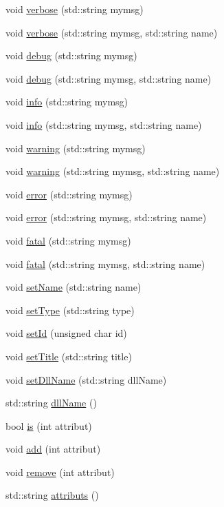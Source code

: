 \begin{DoxyCompactItemize}
\item 
void \hyperlink{classObject_a83d2db2df682907ea1115ad721c1c4a1}{verbose} (std::string mymsg)
\item 
void \hyperlink{classObject_a2d4120195317e2a3c6532e8bb9f3da68}{verbose} (std::string mymsg, std::string name)
\item 
void \hyperlink{classObject_aac010553f022165573714b7014a15f0d}{debug} (std::string mymsg)
\item 
void \hyperlink{classObject_a6c9a0397ca804e04d675ed05683f5420}{debug} (std::string mymsg, std::string name)
\item 
void \hyperlink{classObject_a644fd329ea4cb85f54fa6846484b84a8}{info} (std::string mymsg)
\item 
void \hyperlink{classObject_a1ca123253dfd30fc28b156f521dcbdae}{info} (std::string mymsg, std::string name)
\item 
void \hyperlink{classObject_a65cd4fda577711660821fd2cd5a3b4c9}{warning} (std::string mymsg)
\item 
void \hyperlink{classObject_a11f101db4dd73d9391b0231818881d86}{warning} (std::string mymsg, std::string name)
\item 
void \hyperlink{classObject_a204a95f57818c0f811933917a30eff45}{error} (std::string mymsg)
\item 
void \hyperlink{classObject_ad7f6c457733082efa2f9ff5f5c8e119a}{error} (std::string mymsg, std::string name)
\item 
void \hyperlink{classObject_aad5a16aac7516ce65bd5ec02ab07fc80}{fatal} (std::string mymsg)
\item 
void \hyperlink{classObject_ae62acd3d09f716220f75f252dc38bc9a}{fatal} (std::string mymsg, std::string name)
\item 
void \hyperlink{classObject_ae30fea75683c2d149b6b6d17c09ecd0c}{setName} (std::string name)
\item 
void \hyperlink{classObject_aae534cc9d982bcb9b99fd505f2e103a5}{setType} (std::string type)
\item 
void \hyperlink{classObject_a398fe08cba594a0ce6891d59fe4f159f}{setId} (unsigned char id)
\item 
void \hyperlink{classObject_a89557dbbad5bcaa02652f5d7fa35d20f}{setTitle} (std::string title)
\item 
void \hyperlink{classObject_a870c5af919958c2136623b2d7816d123}{setDllName} (std::string dllName)
\item 
std::string \hyperlink{classObject_a2e3947f2870094c332d7454117f3ec63}{dllName} ()
\item 
bool \hyperlink{classAttrib_a704f26af560909ad22065083bb7d4c34}{is} (int attribut)
\item 
void \hyperlink{classAttrib_a235f773af19c900264a190b00a3b4ad7}{add} (int attribut)
\item 
void \hyperlink{classAttrib_a7d4ef7e32d93cb287792b87b857e79f3}{remove} (int attribut)
\item 
std::string \hyperlink{classAttrib_aee7bbf16b144887f196e1341b24f8a26}{attributs} ()
\end{DoxyCompactItemize}
